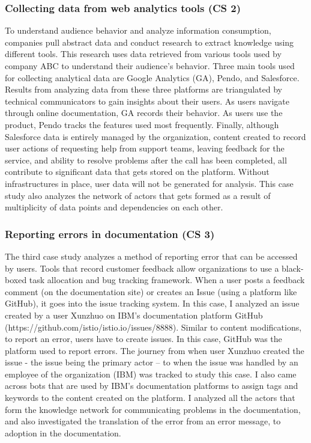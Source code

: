 \subsubsection{Collecting data from web analytics tools (CS 2)}
To understand audience behavior and analyze information consumption, companies pull abstract data and conduct research to extract knowledge using different tools. This research uses data retrieved from various tools used by company ABC to understand their audience’s behavior. Three main tools used for collecting analytical data are Google Analytics (GA), Pendo, and Salesforce. Results from analyzing data from these three platforms are triangulated by technical communicators to gain insights about their users. As users navigate through online documentation, GA records their behavior. As users use the product, Pendo tracks the features used most frequently. Finally, although Salesforce data is entirely managed by the organization, content created to record user actions of requesting help from support teams, leaving feedback for the service, and ability to resolve problems after the call has been completed, all contribute to significant data that gets stored on the platform. Without infrastructures in place, user data will not be generated for analysis. This case study also analyzes the network of actors that gets formed as a result of multiplicity of data points and dependencies on each other.

\subsubsection{Reporting errors in documentation (CS 3)}
The third case study analyzes a method of reporting error that can be accessed by users. Tools that record customer feedback allow organizations to use a black-boxed task allocation and bug tracking framework. When a user posts a feedback comment (on the documentation site) or creates an Issue (using a platform like GitHub), it goes into the issue tracking system. In this case, I analyzed an issue created by a user Xunzhuo on IBM's documentation platform GitHub (https://github.com/istio/istio.io/issues/8888). Similar to content modifications, to report an error, users have to create issues. In this case, GitHub was the platform used to report errors. The journey from when user Xunzhuo created the issue - the issue being the primary actor – to when the issue was handled by an employee of the organization (IBM) was tracked to study this case. I also came across bots that are used by IBM's documentation platforms to assign tags and keywords to the content created on the platform. I analyzed all the actors that form the knowledge network for communicating problems in the documentation, and also investigated the translation of the error from an error message, to adoption in the documentation.

